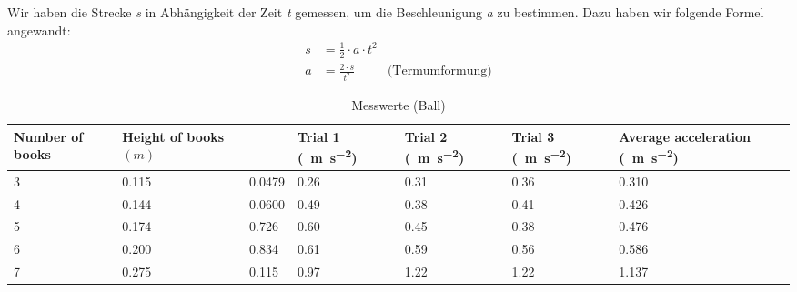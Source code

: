 \documentclass[a4paper, titlepage]{article}
\newcommand{\accunit}[1]{\SI{#1}{\metre\per\square\second}}
\begin{document}
    Wir haben die Strecke \emph{s} in Abhängigkeit
    der Zeit \emph{t} gemessen, um die Beschleunigung
    \emph{a} zu bestimmen. Dazu haben wir folgende Formel
    angewandt:
    \begin{align}
        s &= \frac{1}{2} \cdot a \cdot t^2 \\
        a &= \frac{2 \cdot s}{t^2} &\text{(Termumformung)}
    \end{align}



    \begin{table}
        \begin{tabularx}{\textwidth}{|X|X|X|X|X|X|X|}
            \hline
            \textbf{Number of books} & \textbf{Height of books $(m)$} & 
            \boldmath{$\sin{\theta}$} & \textbf{Trial 1}
            (\accunit{}) & 
            \textbf{Trial 2} (\accunit{}) & 
            \textbf{Trial 3} (\accunit{}) & 
            \textbf{Average acceleration} (\accunit{}) \\
            \hline
            3 & 0.115 & 0.0479 & 0.26 & 0.31 & 0.36 & 0.310 \\
            \hline
            4 & 0.144 & 0.0600 & 0.49 & 0.38 & 0.41 & 0.426 \\
            \hline
            5 & 0.174 & 0.726 & 0.60 & 0.45 & 0.38 & 0.476 \\
            \hline
            6 & 0.200 & 0.834 & 0.61 & 0.59 & 0.56 & 0.586 \\
            \hline
            7 & 0.275 & 0.115 & 0.97 & 1.22 & 1.22 & 1.137 \\
            \hline
        \end{tabularx}
        \caption{Messwerte (Ball)}
    \end{table}
\end{document}
